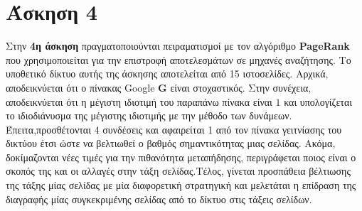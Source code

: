 \documentclass[First Project.tex]{subfiles}
\begin{document}
\section{ Άσκηση 4 }
Στην \textbf{4η άσκηση} πραγματοποιούνται πειραματισμοί με τον αλγόριθμο \textlatin{\textbf{PageRank}} που χρησιμοποιείται για την επιστροφή 
αποτελεσμάτων σε μηχανές αναζήτησης. Το υποθετικό δίκτυο αυτής της άσκησης αποτελείται από 15 ιστοσελίδες. Αρχικά, αποδεικνύεται ότι 
ο πίνακας \textlatin{Google} \textlatin{\textbf{G}}  είναι στοχαστικός. Στην συνέχεια, αποδεικνύεται ότι η μέγιστη ιδιοτιμή του παραπάνω πίνακα 
είναι $1$ και υπολογίζεται το ιδιοδιάνυσμα της μέγιστης ιδιοτιμής με την μέθοδο των δυνάμεων. Έπειτα,προσθέτονται 4 συνδέσεις και αφαιρείται 1 
από τον πίνακα γειτνίασης του δικτύου έτσι ώστε να βελτιωθεί ο βαθμός σημαντικότητας μιας σελίδας. Ακόμα, δοκίμαζονται νέες τιμές για την 
πιθανότητα μεταπήδησης, περιγράφεται ποιος είναι ο σκοπός της και οι αλλαγές στην τάξη σελίδας.Τέλος, γίνεται προσπάθεια βέλτιωσης της 
τάξης μίας σελίδας με μία διαφορετική στρατηγική και μελετάται η επίδραση της διαγραφής μίας συγκεκριμένης σελίδας από το δίκτυο στις τάξεις 
σελίδων.
\end{document}
